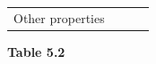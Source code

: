 \begin{enumerate}[noitemsep, label=\textbf{\arabic*}. ]
{{\begin{center}
\begin{tabular}[t]{|l|l|l|l|}
    
     \tabularnewline\cline{1-1}\cline{2-2}\cline{3-3}\cline{4-4}
    
    
        Other properties &
    
    
         &
    
    
         &
    
    
     \tabularnewline\cline{1-1}\cline{2-2}\cline{3-3}\cline{4-4}
    \end{tabular}
      \end{center}
    \begin{center}{\small\bfseries Table 5.2}\end{center}
    
    \addtocounter{footnote}{-0}
    
          }{ %
        
    
        \begin{center}
      
      \label{m38694*id143180}
      

\end{center}}}
\end{enumerate}
